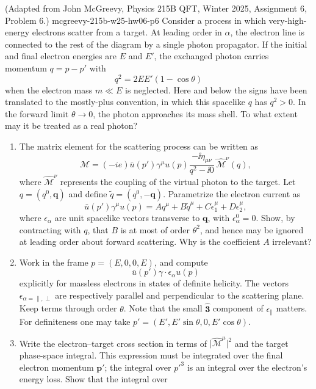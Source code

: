 \begin{enumerate}
  {(Adapted from John McGreevy, Physics 215B QFT, Winter 2025,
  Assignment 6, Problem 6.)}
  {mcgreevy-215b-w25-hw06-p6}
Consider a process in which very-high-energy electrons scatter from a
target.  At leading order in \(\alpha\), the electron line is connected to
the rest of the diagram by a single photon propagator.  If the initial and
final electron energies are \(E\) and \(E'\), the exchanged photon carries
momentum \(q=p-p'\) with
\[
 q^2=2EE'(1-\cos\theta)
\]
when the electron mass \(m\ll E\) is neglected.  Here and below the signs
have been translated to the mostly-plus convention, in which this
spacelike \(q\) has \(q^2>0\).  In the forward limit \(\theta\to0\), the
photon approaches its mass shell.  To what extent may it be treated as a
real photon?
\begin{enumerate}
\item
The matrix element for the scattering process can be written as
\[
 \mathcal M=(-ie)\bar u(p')\gamma^\mu u(p)
 \frac{-\ii\eta_{\mu\nu}}{q^2-\ii0}\,\widehat{\mathcal M}^{\nu}(q),
\]
where \(\widehat{\mathcal M}^{\nu}\) represents the coupling of the
virtual photon to the target.  Let \(q=(q^0,\mathbf q)\) and define
\(\widetilde q=(q^0,-\mathbf q)\).  Parametrize the electron current as
\[
 \bar u(p')\gamma^\mu u(p)
 =Aq^\mu+B\widetilde q^\mu+C\epsilon_1^\mu+D\epsilon_2^\mu,
\]
where \(\epsilon_\alpha\) are unit spacelike vectors transverse to
\(\mathbf q\), with \(\epsilon_\alpha^0=0\).  Show, by contracting with
\(q\), that \(B\) is at most of order \(\theta^2\), and hence may be
ignored at leading order about forward scattering.  Why is the coefficient
\(A\) irrelevant?
\item
Work in the frame \(p=(E,0,0,E)\), and compute
\[
 \bar u(p')\gamma\cdot\epsilon_\alpha u(p)
\]
explicitly for massless electrons in states of definite helicity.  The
vectors \(\epsilon_{\alpha=\parallel,\perp}\) are respectively parallel
and perpendicular to the scattering plane.  Keep terms through order
\(\theta\).  Note that the small \(\widehat{\mathbf 3}\) component of
\(\epsilon_\parallel\) matters.  For definiteness one may take
\(p'=(E',E'\sin\theta,0,E'\cos\theta)\).
\item
Write the electron--target cross section in terms of
\(\lvert\widehat{\mathcal M}^\mu\rvert^2\) and the target phase-space
integral.  This expression must be integrated over the final electron
momentum \(\mathbf p'\); the integral over \(p'^3\) is an integral over
the electron's energy loss.  Show that the integral over

\end{enumerate}
\end{enumerate}

